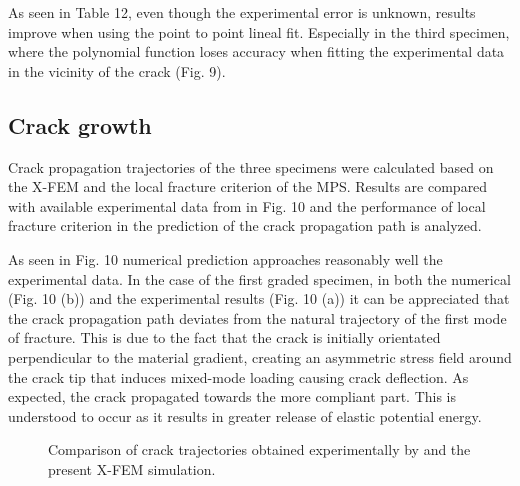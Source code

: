 As seen in Table 12, even though the experimental error is unknown, results improve when using the point to point lineal fit. Especially in the third specimen, where the polynomial function loses accuracy when fitting the experimental data in the vicinity of the crack (Fig. 9).

\subsection{Crack growth}

Crack propagation trajectories of the three specimens were calculated based on the X-FEM and the local fracture criterion of the MPS. Results are compared with available experimental data from \cite{Abanto-Bueno2006} in Fig. 10 and the performance of local fracture criterion in the prediction of the crack propagation path is analyzed.

As seen in Fig. 10 numerical prediction approaches reasonably well the experimental data. In the case of the first graded specimen, in both the numerical (Fig. 10 (b)) and the experimental results (Fig. 10 (a)) it can be appreciated that the crack propagation path deviates from the natural trajectory of the first mode of fracture. This is due to the fact that the crack is initially orientated perpendicular to the material gradient, creating an asymmetric stress field around the crack tip that induces mixed-mode loading causing crack deflection. As expected, the crack propagated towards the more compliant part. This is understood to occur as it results in greater release of elastic potential energy.

\begin{figure*}[!ht]
    \hfill
    
    \hfill
    
    \hfill
    \caption{Comparison of crack trajectories obtained experimentally by \cite{Abanto-Bueno2006} and the present X-FEM simulation.}
    \label{fig:Fig10}
\end{figure*}

